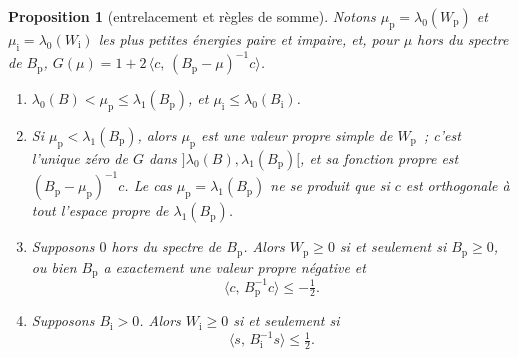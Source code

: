 \documentclass[11pt,a4paper]{article}
\newtheorem{proposition}[theoreme]{Proposition}
\theoremstyle{definition}
\theoremstyle{remark}
\newcommand{\ps}[2]{\langle #1,\,#2\rangle}
\begin{document}
\begin{proposition}[entrelacement et règles de somme]\label{prop:entrelacement}
Notons $\mu_{\mathrm p}=\lambda_0(W_{\mathrm p})$ et $\mu_{\mathrm i}=\lambda_0(W_{\mathrm i})$ les plus petites énergies paire et impaire, et,
pour $\mu$ hors du spectre de $B_{\mathrm p}$, $G(\mu)=1+2\,\ps{c}{(B_{\mathrm p}-\mu)^{-1}c}$.
\begin{enumerate}
\item[(a)] $\lambda_0(B)<\mu_{\mathrm p}\le\lambda_1(B_{\mathrm p})$, et $\mu_{\mathrm i}\le\lambda_0(B_{\mathrm i})$.
\item[(b)] Si $\mu_{\mathrm p}<\lambda_1(B_{\mathrm p})$, alors $\mu_{\mathrm p}$ est une valeur propre simple de $W_{\mathrm p}$~; c'est l'unique zéro de $G$
dans $]\lambda_0(B),\lambda_1(B_{\mathrm p})[$, et sa fonction propre est $(B_{\mathrm p}-\mu_{\mathrm p})^{-1}c$. Le cas
$\mu_{\mathrm p}=\lambda_1(B_{\mathrm p})$ ne se produit que si $c$ est orthogonale à tout l'espace propre de $\lambda_1(B_{\mathrm p})$.
\item[(c)] Supposons $0$ hors du spectre de $B_{\mathrm p}$. Alors $W_{\mathrm p}\ge0$ si et seulement si $B_{\mathrm p}\ge 0$, ou bien
$B_{\mathrm p}$ a exactement une valeur propre négative et
\begin{equation}\label{eq:regle-paire}
\ps{c}{B_{\mathrm p}^{-1}c}\le-\tfrac12 .
\end{equation}
\item[(d)] Supposons $B_{\mathrm i}>0$. Alors $W_{\mathrm i}\ge0$ si et seulement si
\begin{equation}\label{eq:regle-impaire}
\ps{s}{B_{\mathrm i}^{-1}s}\le\tfrac12 .
\end{equation}
\end{enumerate}
\end{proposition}
\end{document}
